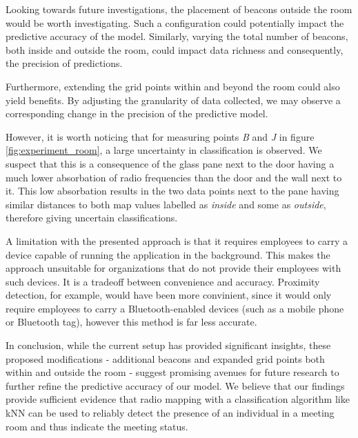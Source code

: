 Looking towards future investigations, the placement of beacons outside the room would be worth investigating.
Such a configuration could potentially impact the predictive accuracy of the model.
Similarly, varying the total number of beacons, both inside and outside the room, could impact data richness and consequently, the precision of predictions.

Furthermore, extending the grid points within and beyond the room could also yield benefits. By adjusting the granularity of data collected, we may observe a corresponding change in the precision of the predictive model. 

However, it is worth noticing that for measuring points \textit{B} and \textit{J} in figure \ref{fig:experiment_room}, a large uncertainty in classification is observed.
We suspect that this is a consequence of the glass pane next to the door having a much lower absorbation of radio frequencies than the door and the wall next to it.
This low absorbation results in the two data points next to the pane having similar distances to both map values labelled as \textit{inside} and some as \textit{outside}, therefore giving uncertain classifications.

A limitation with the presented approach is that it requires employees to carry a device capable of running the application in the background.
This makes the approach unsuitable for organizations that do not provide their employees with such devices.
It is a tradeoff between convenience and accuracy.
Proximity detection, for example, would have been more convinient, since it would only require employees to carry a Bluetooth-enabled devices (such as a mobile phone or Bluetooth tag), however this method is far less accurate.

In conclusion, while the current setup has provided significant insights, these proposed modifications - additional beacons and expanded grid points both within and outside the room - suggest promising avenues for future research to further refine the predictive accuracy of our model.
We believe that our findings provide sufficient evidence that radio mapping with a classification algorithm like kNN can be used to reliably detect the presence of an individual in a meeting room and thus indicate the meeting status.